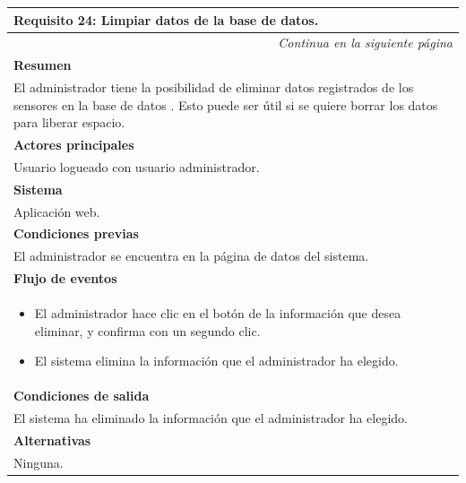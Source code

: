\begin{longtable}{|p{}|}
\hline
 \rowcolor[gray]{.5}
 \color{white}\textbf{Requisito 24: Limpiar datos de la base de datos.} \\
\hline
\endfirsthead
\endhead
\hline \multicolumn{1}{r}{\textit{Continua en la siguiente página}} \\
\endfoot
\endlastfoot
    \rowcolor[gray]{.9}
     \textbf{Resumen} \\
     \hline
     El administrador tiene la posibilidad de eliminar datos registrados de los sensores en la base de datos . Esto puede ser útil si se quiere borrar los datos para liberar espacio. \\
     \hline
     \rowcolor[gray]{.9}
     \textbf{Actores principales} \\
     \hline
     Usuario logueado con usuario administrador. \\
     \hline
     \rowcolor[gray]{.9}
     \textbf{Sistema} \\
     \hline
     Aplicación web. \\
     \hline
     \rowcolor[gray]{.9}
     \textbf{Condiciones previas} \\
     \hline
     El administrador se encuentra en la página de datos del sistema. \\
     \hline
     \rowcolor[gray]{.9}
     \textbf{Flujo de eventos}  \\
     \hline
      \begin{itemize}
         \item El administrador hace clic en el botón de la información que desea eliminar, y confirma con un segundo clic.
         \item El sistema elimina la información que el administrador ha elegido.
     \end{itemize} \\
     \hline
     \rowcolor[gray]{.9}
     \textbf{Condiciones de salida} \\
     \hline
     El sistema ha eliminado la información que el administrador ha elegido. \\
     \hline
     \rowcolor[gray]{.9}
     \textbf{Alternativas}  \\
     \hline
      Ninguna. \\
     \hline
\end{longtable}

